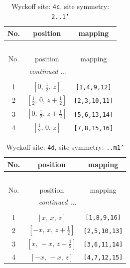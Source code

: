 \documentclass[fleqn,8pt]{jsarticle}
\begin{document}
\renewcommand{\arraystretch}{1.2}
\begin{longtable}{ccc}
\caption{Wyckoff site: {\tt 4c}, site symmetry: {\tt 2..1'}}
 \\
 \hline \hline
No. & position & mapping \\ \hline \endfirsthead

\multicolumn{2}{l}{\tablename\ \thetable{}} \\
 \hline \hline
No. & position & mapping \\ \hline \endhead

 \hline \hline
\multicolumn{2}{r}{\footnotesize\it continued ...} \\ \endfoot

 \hline \hline
\multicolumn{2}{r}{} \\ \endlastfoot

1 & $\left[ 0,\, \frac{1}{2},\, z \right]$ & {\tt [1,4,9,12]} \\ \hline
2 & $\left[ \frac{1}{2},\, 0,\, z + \frac{1}{2} \right]$ & {\tt [2,3,10,11]} \\ \hline
3 & $\left[ 0,\, \frac{1}{2},\, z + \frac{1}{2} \right]$ & {\tt [5,6,13,14]} \\ \hline
4 & $\left[ \frac{1}{2},\, 0,\, z \right]$ & {\tt [7,8,15,16]} \\
\end{longtable}
\renewcommand{\arraystretch}{1.2}
\begin{longtable}{ccc}
\caption{Wyckoff site: {\tt 4d}, site symmetry: {\tt ..m1'}}
 \\
 \hline \hline
No. & position & mapping \\ \hline \endfirsthead

\multicolumn{2}{l}{\tablename\ \thetable{}} \\
 \hline \hline
No. & position & mapping \\ \hline \endhead

 \hline \hline
\multicolumn{2}{r}{\footnotesize\it continued ...} \\ \endfoot

 \hline \hline
\multicolumn{2}{r}{} \\ \endlastfoot

1 & $\left[ x,\, x,\, z \right]$ & {\tt [1,8,9,16]} \\ \hline
2 & $\left[ - x,\, x,\, z + \frac{1}{2} \right]$ & {\tt [2,5,10,13]} \\ \hline
3 & $\left[ x,\, - x,\, z + \frac{1}{2} \right]$ & {\tt [3,6,11,14]} \\ \hline
4 & $\left[ - x,\, - x,\, z \right]$ & {\tt [4,7,12,15]} \\
\end{longtable}
\end{document}
